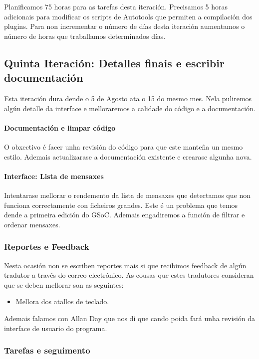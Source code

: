 Planificamos 75 horas para as tarefas desta iteración. Precisamos 5 horas adicionais para modificar os scripts de Autotools que permiten a compilación dos plugins. Para non incrementar o número de días desta iteración aumentamos o número de horas que traballamos determinados días.


\subsection{Quinta Iteración: Detalles finais e escribir documentación}
Esta iteración dura dende o 5 de Agosto ata o 15 do mesmo mes. Nela puliremos algún detalle da interface e melloraremos a calidade do código e a documentación.

\paragraph{Documentación e limpar código} O obxectivo é facer unha revisión do código para que este manteña un mesmo estilo. Ademais actualizarase a documentación existente e crearase algunha nova.

\paragraph{Interface: Lista de mensaxes} Intentarase mellorar o rendemento da lista de mensaxes que detectamos que non funciona correctamente con ficheiros grandes. Este é un problema que temos dende a primeira edición do GSoC. Ademais engadiremos a función de filtrar e ordenar mensaxes.

\subsubsection{Reportes e Feedback}
Nesta ocasión non se escriben reportes mais si que recibimos feedback de algún tradutor a través do correo electrónico. As cousas que estes tradutores consideran que se deben mellorar son as seguintes:

\begin{itemize}
   \item Mellora dos atallos de teclado.
\end{itemize}

Ademais falamos con Allan Day que nos di que cando poida fará unha revisión da interface de usuario do programa.

\subsubsection{Tarefas e seguimento}

